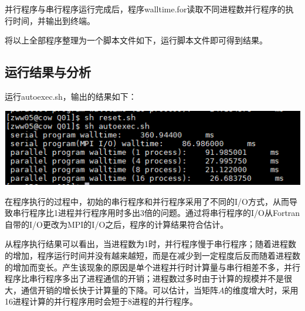 \documentclass{article}
\begin{document}
并行程序与串行程序运行完成后，程序walltime.for读取不同进程数并行程序的执行时间，并输出到终端。	

\begin{center}
	
\end{center}	

将以上全部程序整理为一个脚本文件如下，运行脚本文件即可得到结果。

\begin{center}
	
\end{center}

\subsection{运行结果与分析}

运行autoexec.sh，输出的结果如下：\\
\begin{center}
	\includegraphics[width=0.9\linewidth]{Q01.png}
\end{center}

在程序执行的过程中，初始的串行程序和并行程序采用了不同的I/O方式，从而导致串行程序比1进程并行程序用时多出3倍的问题。通过将串行程序的I/O从Fortran自带的I/O更改为MPI的I/O之后，程序的计算结果符合估计。

从程序执行结果可以看出，当进程数为1时，并行程序慢于串行程序；随着进程数的增加，程序运行时间并没有越来越短，而是在减少到一定程度后反而随着进程数的增加而变长。产生该现象的原因是单个进程并行时计算量与串行相差不多，并行程序比串行程序多出了进程通信的开销；进程数过多时由于计算的规模并不是很大，通信开销的增长快于计算量的下降。可以估计，当矩阵$A$的维度增大时，采用16进程计算的并行程序用时会短于8进程的并行程序。
\end{document}

